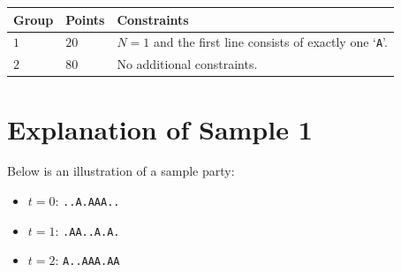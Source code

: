 \noindent
\begin{tabular}{| l | l | p{12cm} |}
  \hline
  \textbf{Group} & \textbf{Points} & \textbf{Constraints} \\ \hline
  $1$    & $20$       & $N=1$ and the first line consists of exactly one `\texttt{A}'. \\ \hline
  $2$    & $80$       & No additional constraints. \\ \hline
\end{tabular}


\section*{Explanation of Sample 1}
Below is an illustration of a sample party:

\begin{itemize}
\item $t=0$: \texttt{..A.AAA..}
\item $t=1$: \texttt{.AA..A.A.}
\item $t=2$: \texttt{A..AAA.AA}
\end{itemize}

